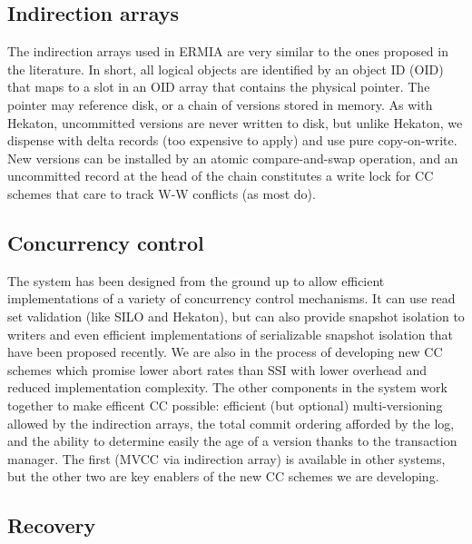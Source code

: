 \subsection{Indirection arrays}

The indirection arrays used in ERMIA are very similar to the ones proposed in the literature. In short, all logical objects are identified by an object ID (OID) that maps to a slot in an OID array that contains the physical pointer. The pointer may reference disk, or a chain of versions stored in memory. As with Hekaton, uncommitted versions are never written to disk, but unlike Hekaton, we dispense with delta records (too expensive to apply) and use pure copy-on-write. New versions can be installed by an atomic compare-and-swap operation, and an uncommitted record at the head of the chain constitutes a write lock for CC schemes that care to track W-W conflicts (as most do). 

\subsection{Concurrency control}

The system has been designed from the ground up to allow efficient implementations of a variety of concurrency control mechanisms. It can use read set validation (like SILO and Hekaton), but can also provide snapshot isolation to writers and even efficient implementations of serializable snapshot isolation that have been proposed recently\cite{Fekete}. We are also in the process of developing new CC schemes which promise lower abort rates than SSI with lower overhead and reduced implementation complexity. The other components in the system work together to make efficent CC possible: efficient (but optional) multi-versioning allowed by the indirection arrays, the total commit ordering afforded by the log, and the ability to determine easily the age of a version thanks to the transaction manager. The first (MVCC via indirection array) is available in other systems, but the other two are key enablers of the new CC schemes we are developing.

\subsection{Recovery}

